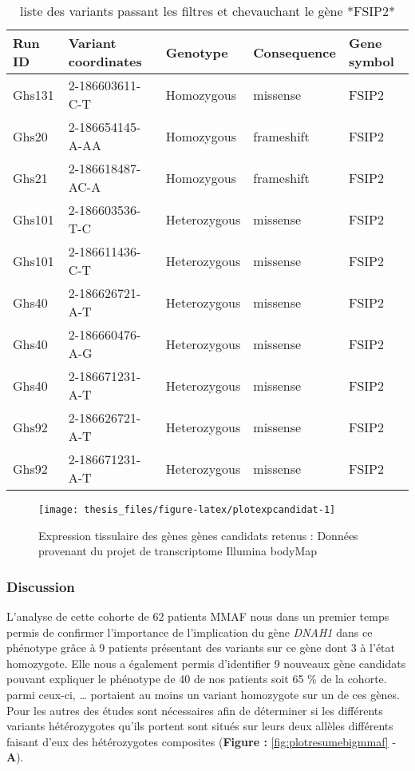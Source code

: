 \documentclass[12pt,twoside]{reedthesis}
\theoremstyle{definition}
\theoremstyle{definition}
\theoremstyle{remark}
\begin{document}
  \begin{longtable}[t]{lllll}
  \caption{\label{tab:tabfsip2}liste des variants passant les filtres et chevauchant le gène *FSIP2*}\\
  \toprule
  Run ID & Variant coordinates & Genotype & Consequence & Gene symbol\\
  \midrule
  Ghs131 & 2-186603611-C-T & Homozygous & missense & FSIP2\\
  Ghs20 & 2-186654145-A-AA & Homozygous & frameshift & FSIP2\\
  Ghs21 & 2-186618487-AC-A & Homozygous & frameshift & FSIP2\\
  Ghs101 & 2-186603536-T-C & Heterozygous & missense & FSIP2\\
  Ghs101 & 2-186611436-C-T & Heterozygous & missense & FSIP2\\
  \addlinespace
  Ghs40 & 2-186626721-A-T & Heterozygous & missense & FSIP2\\
  Ghs40 & 2-186660476-A-G & Heterozygous & missense & FSIP2\\
  Ghs40 & 2-186671231-A-T & Heterozygous & missense & FSIP2\\
  Ghs92 & 2-186626721-A-T & Heterozygous & missense & FSIP2\\
  Ghs92 & 2-186671231-A-T & Heterozygous & missense & FSIP2\\
  \bottomrule
  \end{longtable}
  
  \newpage
  
  \begin{figure}
  
  {\centering \texttt{[image: thesis\_files/figure-latex/plotexpcandidat-1]} 
  
  }
  
  \caption[Expression tissulaire des gènes gènes candidats retenus]{Expression tissulaire des gènes gènes candidats retenus : Données provenant du projet de transcriptome Illumina bodyMap}\label{fig:plotexpcandidat}
  \end{figure}
  
  \newpage
  
  \subsubsection{Discussion}\label{discussion-1}
  
  L'analyse de cette cohorte de 62 patients MMAF nous dans un premier
  temps permis de confirmer l'importance de l'implication du gène
  \emph{DNAH1} dans ce phénotype grâce à 9 patients présentant des
  variants sur ce gène dont 3 à l'état homozygote. Elle nous a également
  permis d'identifier 9 nouveaux gène candidats pouvant expliquer le
  phénotype de 40 de nos patients soit 65 \% de la cohorte. parmi ceux-ci,
  \ldots{} portaient au moins un variant homozygote sur un de ces gènes.
  Pour les autres des études sont nécessaires afin de déterminer si les
  différents variants hétérozygotes qu'ils portent sont situés sur leurs
  deux allèles différents faisant d'eux des hétérozygotes composites
  (\textbf{Figure : }\ref{fig:plotresumebigmmaf} - \textbf{A}).
  
\end{document}
